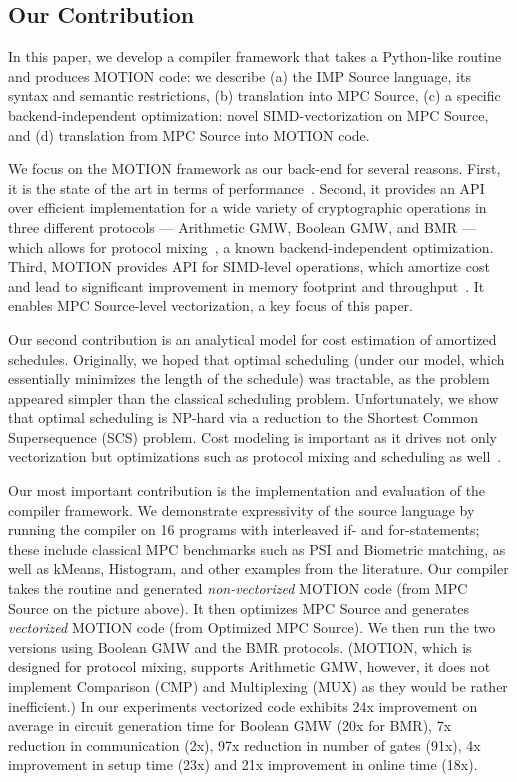 \subsection{Our Contribution} In this paper, we develop a compiler framework that takes a Python-like routine and produces MOTION code: we describe (a) the IMP Source language, its syntax and semantic restrictions, (b) translation into MPC Source, (c) a specific backend-independent optimization: novel SIMD-vectorization on MPC Source, and (d) translation from MPC Source into MOTION code. %

We focus on the MOTION framework as our back-end for several reasons. First, it is the state of the art in terms of performance~\cite{Braun:2022}. Second, it provides an API over efficient implementation for a wide variety of cryptographic operations in three different protocols ---  Arithmetic GMW, Boolean GMW, and BMR --- which allows for protocol mixing~\cite{Buscher:2018b,Ishaq:2019, Fang:2022}, a known backend-independent optimization. Third, MOTION provides API for SIMD-level operations, which amortize cost and lead to significant improvement in memory footprint and
throughput~\cite{Demmler:2015, Araki:2018, Braun:2022}. It enables MPC Source-level vectorization, a key focus of this paper.

Our second contribution is an analytical model for cost estimation of amortized schedules. Originally, we hoped that optimal scheduling (under our model, which essentially minimizes the length of the schedule) was tractable, as the problem appeared simpler than the classical scheduling problem. Unfortunately, we show that optimal scheduling is NP-hard via a reduction to the Shortest Common Supersequence (SCS) problem. Cost modeling is important as it drives not only vectorization but optimizations such as protocol mixing and scheduling as well~\cite{Buscher:2018b}.

Our most important contribution is the implementation and evaluation of the compiler framework. We demonstrate expressivity of the source language by running the compiler on 16 programs with interleaved if- and for-statements; these include classical MPC benchmarks such as PSI and Biometric matching, as well as kMeans, Histogram, and other examples from the literature. 
Our compiler takes the routine and generated \emph{non-vectorized} MOTION code (from MPC Source on the picture above). It then optimizes MPC Source and generates 
\emph{vectorized} MOTION code (from Optimized MPC Source). We then run the two versions using Boolean GMW and the BMR protocols. (MOTION, which is designed for 
protocol mixing, supports Arithmetic GMW, however, it does not implement Comparison (CMP) and Multiplexing (MUX) as they would be rather inefficient.)
In our experiments vectorized code exhibits 24x improvement on average in circuit generation time for Boolean GMW (20x for BMR), 7x reduction 
in communication (2x), 97x reduction in number of gates (91x), 4x improvement in setup time (23x) and 21x improvement in online time (18x).

